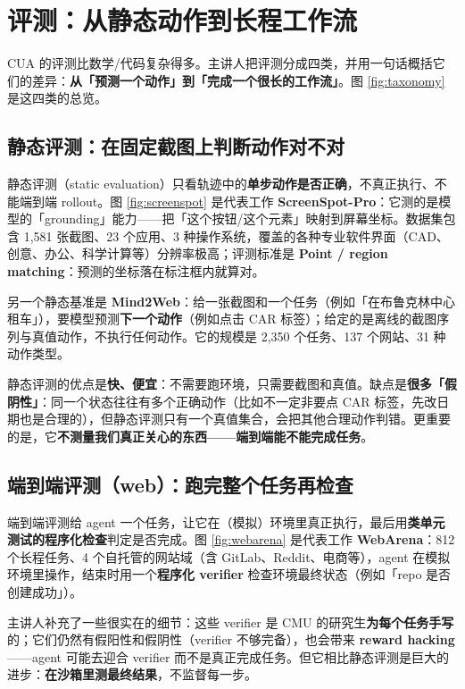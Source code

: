 ﻿\documentclass[a4paper]{article}
\begin{document}
\section{评测：从静态动作到长程工作流}

CUA 的评测比数学/代码复杂得多。主讲人把评测分成四类，并用一句话概括它们的差异：\textbf{从「预测一个动作」到「完成一个很长的工作流」}。图 \ref{fig:taxonomy} 是这四类的总览。

\subsection{静态评测：在固定截图上判断动作对不对}

静态评测（static evaluation）只看轨迹中的\textbf{单步动作是否正确}，不真正执行、不能端到端 rollout。图 \ref{fig:screenspot} 是代表工作 \textbf{ScreenSpot-Pro}：它测的是模型的「grounding」能力——把「这个按钮/这个元素」映射到屏幕坐标。数据集包含 1,581 张截图、23 个应用、3 种操作系统，覆盖的各种专业软件界面（CAD、创意、办公、科学计算等）分辨率极高；评测标准是 \textbf{Point / region matching}：预测的坐标落在标注框内就算对。

另一个静态基准是 \textbf{Mind2Web}：给一张截图和一个任务（例如「在布鲁克林中心租车」），要模型预测\textbf{下一个动作}（例如点击 CAR 标签）；给定的是离线的截图序列与真值动作，不执行任何动作。它的规模是 2,350 个任务、137 个网站、31 种动作类型。

静态评测的优点是\textbf{快、便宜}：不需要跑环境，只需要截图和真值。缺点是\textbf{很多「假阴性」}：同一个状态往往有多个正确动作（比如不一定非要点 CAR 标签，先改日期也是合理的），但静态评测只有一个真值集合，会把其他合理动作判错。更重要的是，它\textbf{不测量我们真正关心的东西——端到端能不能完成任务}。

\subsection{端到端评测（web）：跑完整个任务再检查}

端到端评测给 agent 一个任务，让它在（模拟）环境里真正执行，最后用\textbf{类单元测试的程序化检查}判定是否完成。图 \ref{fig:webarena} 是代表工作 \textbf{WebArena}：812 个长程任务、4 个自托管的网站域（含 GitLab、Reddit、电商等），agent 在模拟环境里操作，结束时用一个\textbf{程序化 verifier} 检查环境最终状态（例如「repo 是否创建成功」）。

主讲人补充了一些很实在的细节：这些 verifier 是 CMU 的研究生\textbf{为每个任务手写}的；它们仍然有假阳性和假阴性（verifier 不够完备），也会带来 \textbf{reward hacking}——agent 可能去迎合 verifier 而不是真正完成任务。但它相比静态评测是巨大的进步：\textbf{在沙箱里测最终结果}，不监督每一步。
\end{document}
